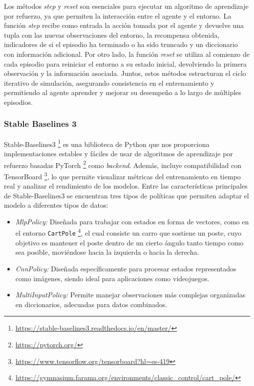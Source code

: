 Los métodos \textit{step} y \textit{reset} son esenciales para ejecutar un algoritmo de aprendizaje por refuerzo, ya que permiten la interacción entre el agente y el entorno. La función \textit{step} recibe como entrada la acción tomada por el agente y devuelve una tupla con las nuevas observaciones del entorno, la recompensa obtenida, indicadores de si el episodio ha terminado o ha sido truncado y un diccionario con información adicional. Por otro lado, la función \textit{reset} se utiliza al comienzo de cada episodio para reiniciar el entorno a su estado inicial, devolviendo la primera observación y la información asociada. Juntos, estos métodos estructuran el ciclo iterativo de simulación, asegurando consistencia en el entrenamiento y permitiendo al agente aprender y mejorar su desempeño a lo largo de múltiples episodios.

\subsubsection{Stable Baselines 3}
\label{sec:stable_baselines3}

Stable-Baselines3 \footnote{\url{https://stable-baselines3.readthedocs.io/en/master/}} es una biblioteca de Python que nos proporciona implementaciones estables y fáciles de usar de algoritmos de aprendizaje por refuerzo basadas PyTorch \footnote{\url{https://pytorch.org/}} como \textit{backend}. Además, incluye compatibilidad con TensorBoard \footnote{\url{https://www.tensorflow.org/tensorboard?hl=es-419}}, lo que permite visualizar métricas del entrenamiento en tiempo real y analizar el rendimiento de los modelos. Entre las características principales de Stable-Baselines3 se encuentran tres tipos de políticas que permiten adaptar el modelo a diferentes tipos de datos:

 \begin{itemize} 
\item \textit{MlpPolicy:} Diseñada para trabajar con estados en forma de vectores, como en el entorno \texttt{CartPole} \footnote{\url{https://gymnasium.farama.org/environments/classic_control/cart_pole/}}, el cual consiste un carro que sostiene un poste, cuyo objetivo es mantener el poste dentro de un cierto ángulo tanto tiempo como sea posible, moviéndose hacia la izquierda o hacia la derecha. 
\item \textit{CnnPolicy:} Diseñada específicamente para procesar estados representados como imágenes, siendo ideal para aplicaciones como videojuegos.
\item \textit{MultiInputPolicy:} Permite manejar observaciones más complejas organizadas en diccionarios, adecuadas para datos combinados. 
\end{itemize} 

